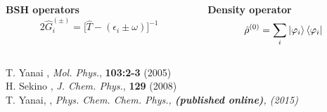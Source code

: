 \begin{frame}
\vspace{7mm}

\begin{columns}
\begin{column}[b]{0.48\linewidth}
\centering
\textbf{BSH operators} 
\begin{equation}
    \nonumber
    2\hat{G}_i^{(\pm)} = \Big[\hat{T} - (\epsilon_i \pm \omega)\Big]^{-1} 
\end{equation}
\end{column}

\begin{column}[b]{0.48\linewidth}
\centering
\textbf{Density operator}
\begin{equation}
    \nonumber
    \hat{\rho}^{(0)} = \sum_i \ket{\varphi_i}\bra{\varphi_i}
\end{equation}
\end{column}
\end{columns}

\vspace{5mm}
\centering
\tiny
T. Yanai \etal,
{\it Mol. Phys.},
\textbf{103:2-3} 
(2005)\\
H. Sekino \etal,
{\it J. Chem. Phys.},
\textbf{129} 
(2008)\\
T. Yanai, \etal,
\it{Phys. Chem. Chem. Phys.}, 
\textbf{(published online)},
(2015)

\end{frame}

